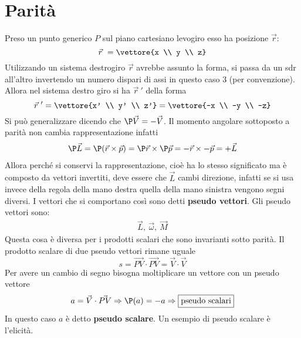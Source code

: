 \documentclass[12pt]{book}
\begin{document}
\section{Parità}
Preso un punto generico $P$ sul piano cartesiano levogiro esso ha posizione $\vec r$:
\begin{equation}
	\vec r \ = \vettore{x \\ y \\ z}
\end{equation}
Utilizzando un sistema destrogiro $\vec r$ avrebbe assunto la forma, si passa da un sdr all'altro invertendo un numero dispari di assi in questo caso 3 (per convenzione). Allora nel sistema destro giro si ha $\vec r \ '$ della forma
\begin{equation}
	\vec r \ '= \vettore{x' \\ y' \\ z'}=
\vettore{-x \\ -y \\ -z}
\end{equation}
Si può generalizzare dicendo che $\P \vec V = - \vec V$.  Il momento angolare sottoposto a parità non cambia rappresentazione infatti 
\begin{gather}
	\P \vec L = \P ( \vec r \times \vec p ) = \P \vec r \times \P \vec p = - \vec r \times - \vec p = + \vec L 
\end{gather}
Allora perché si conservi la rappresentazione, cioè ha lo stesso significato ma è composto da vettori invertiti, deve essere che $\vec L$ cambi direzione, infatti se si usa invece della regola della mano destra quella della mano sinistra vengono segni diversi. I vettori che si comportano così sono detti \textbf{pseudo vettori}. Gli pseudo vettori sono:
\begin{gather}
	\vec L , \ \vec \omega , \ \vec M
\end{gather}
Questa cosa è diversa per i prodotti scalari che sono invarianti sotto parità. Il prodotto scalare di due pseudo vettori rimane uguale
\begin{equation}
	s = \vec{ PV} \cdot \vec{PV}  = \vec V \cdot \vec V 
\end{equation}
Per avere un cambio di segno bisogna moltiplicare un vettore con un pseudo vettore
\begin{gather}
	a= \vec V \cdot \vec{P V} \Rightarrow \P(a)=-a \Rightarrow \boxed{\text{pseudo scalari}}
\end{gather}
In questo caso $a$ è detto \textbf{pseudo scalare}. Un esempio di pseudo scalare è l'elicità. 
\end{document}
